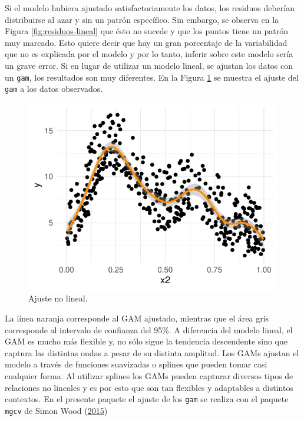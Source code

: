 \documentclass[
  12pt]{article}
\begin{document}
Si el modelo hubiera ajustado satisfactoriamente los datos, los residuos deberían distribuirse al azar y sin un patrón específico. Sin embargo, se observa en la Figura \ref{fig:residuos-lineal} que ésto no sucede y que los puntos tiene un patrón muy marcado. Esto quiere decir que hay un gran porcentaje de la variabilidad que no es explicada por el modelo y por lo tanto, inferir sobre este modelo sería un grave error.
Si en lugar de utilizar un modelo lineal, se ajustan los datos con un \texttt{gam}, los resultados son muy diferentes. En la Figura \ref{fig:ajuste-gam} se muestra el ajuste del \texttt{gam} a los datos observados.

\begin{figure}[H]

{\centering \includegraphics{Manual_Generador_files/figure-latex/ajuste-gam-1} 

}

\caption{Ajuste no lineal.}\label{fig:ajuste-gam}
\end{figure}

La línea naranja corresponde al GAM ajustado, mientras que el área gris corresponde al intervalo de confianza del 95\%. A diferencia del modelo lineal, el GAM es mucho más flexible y, no sólo sigue la tendencia descendente sino que captura las distintas ondas a pesar de su distinta amplitud.
Los GAMs ajustan el modelo a través de funciones suavizadas o splines que pueden tomar casi cualquier forma. Al utilizar splines los GAMs pueden capturar diversos tipos de relaciones no lineales y es por esto que son tan flexibles y adaptables a distintos contextos. En el presente paquete el ajuste de los \texttt{gam} se realiza con el paquete \texttt{mgcv} de Simon Wood (\protect\hyperlink{ref-RN5393}{2015})
\end{document}
